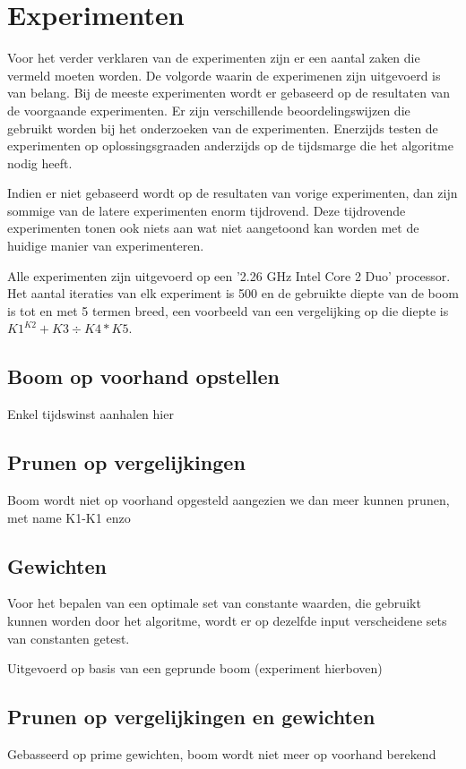\documentclass[Main.tex]{subfiles}
\begin{document}
\section{Experimenten}
Voor het verder verklaren van de experimenten zijn er een aantal zaken die vermeld moeten worden. De volgorde waarin de experimenen zijn uitgevoerd is van belang. Bij de meeste experimenten wordt er gebaseerd op de resultaten van de voorgaande experimenten. Er zijn verschillende beoordelingswijzen die gebruikt worden bij het onderzoeken van de experimenten. Enerzijds testen de experimenten op oplossingsgraad\footnotemark[\ref{note:oplossingsgraad}] en anderzijds op de tijdsmarge die het algoritme nodig heeft. 
\par
Indien er niet gebaseerd wordt op de resultaten van vorige experimenten, dan zijn sommige van de latere experimenten enorm tijdrovend. Deze tijdrovende experimenten tonen ook niets aan wat niet aangetoond kan worden met de huidige manier van experimenteren.
\par
Alle experimenten zijn uitgevoerd op een '2.26 GHz Intel Core 2 Duo' processor. Het aantal iteraties van elk experiment is 500 en de gebruikte diepte van de boom is tot en met 5 termen breed, een voorbeeld van een vergelijking op die diepte is $K1^{K2}+K3 \div K4*K5$.

\subsection{Boom op voorhand opstellen}

Enkel tijdswinst aanhalen hier %

\subsection{Prunen op vergelijkingen}


Boom wordt niet op voorhand opgesteld aangezien we dan meer kunnen prunen, met name K1-K1 enzo
\subsection{Gewichten}
Voor het bepalen van een optimale set van constante waarden, die gebruikt kunnen worden door het algoritme, wordt er op dezelfde input verscheidene sets van constanten getest. 


Uitgevoerd op basis van een geprunde boom (experiment hierboven)
\subsection{Prunen op vergelijkingen en gewichten}
Gebasseerd op prime gewichten, boom wordt niet meer op voorhand berekend
\end{document}
